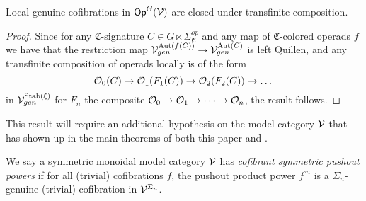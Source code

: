 \documentclass[a4paper,10pt
,draft
]{article}%
\renewcommand{\1}{\eta}%
\newcommand{\SC}{\Sigma_{\mathfrak C}}
\begin{document}
\begin{lemma}
      \label{TRANSCOMP_LGC_LEM}
      Local genuine cofibrations in $\mathsf{Op}^G(\mathcal V)$ are closed under transfinite composition.
\end{lemma}
\begin{proof}
      Since for any $\mathfrak C$-signature $C \in G \ltimes \SC^{op}$ and any map of $\mathfrak C$-colored operads $f$ we have that
      the restriction map
      $\mathcal V^{\operatorname{Aut}(f(C))}_{gen} \to \mathcal V^{\operatorname{Aut}(C)}_{gen}$
      is left Quillen,
      and any transfinite composition of operads locally is of the form
      \begin{equation}
            \mathcal{O}_0(C) \to \mathcal{O}_1(F_1(C)) \to \mathcal{O}_2(F_2(C)) \to \dots   
      \end{equation}
      in $\mathcal V^{\mathrm{Stab}(\xi)}_{gen}$
      for $F_n$ the composite $\mathcal{O}_0 \to \mathcal{O}_1 \to \dots \to \mathcal{O}_n$,
      the result follows.
\end{proof}

This result will require an additional hypothesis on the model category $\mathcal V$
that has shown up in the main theorems of both this paper and \cite{BP_geo}.


\begin{definition}
      \label{CSPP_DEF}
      We say a symmetric monoidal model category $\mathcal V$ has \textit{cofibrant symmetric pushout powers} if
      for all (trivial) cofibrations $f$, the pushout product power $f^{\square n}$
      is a $\Sigma_n$-genuine (trivial) cofibration in $\mathcal V^{\Sigma_n}$. 
\end{definition}
\end{document}
